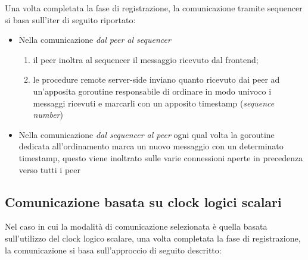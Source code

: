 \documentclass[conference]{IEEEtran}
\begin{document}
Una volta completata la fase di registrazione, la comunicazione tramite sequencer si basa sull'iter di seguito riportato:

\begin{itemize}
\item Nella comunicazione \textsl{dal peer al sequencer}
\begin{enumerate}
\item il peer inoltra al sequencer il messaggio ricevuto dal frontend; 
\item le procedure remote server-side inviano quanto ricevuto dai peer ad un'apposita goroutine responsabile di ordinare in modo univoco i messaggi ricevuti e marcarli con un apposito timestamp (\textit{sequence number})
\end{enumerate}

\item Nella comunicazione \textsl{dal sequencer al peer} ogni qual volta la goroutine dedicata all'ordinamento marca un nuovo messaggio con un determinato timestamp, questo viene inoltrato sulle varie connessioni aperte in precedenza verso tutti i peer
\end{itemize}

\subsection{Comunicazione basata su clock logici scalari}
Nel caso in cui la modalità di comunicazione selezionata è quella basata sull'utilizzo del clock logico scalare, una volta completata la fase di registrazione, la comunicazione si basa sull'approccio di seguito descritto:
\end{document}
